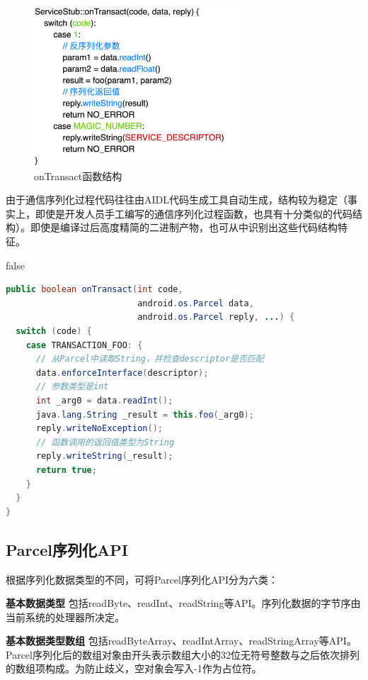 \documentclass[winfonts,master,twoside]{njuthesis}
\begin{document}
\begin{figure}
	\centering
	\includegraphics[width=0.7\textwidth]{figure/3-extractor/ontransact-impl.png}
	\caption{onTransact函数结构}
	\label{ontransact-impl}
\end{figure}

由于通信序列化过程代码往往由AIDL代码生成工具自动生成，结构较为稳定（事实上，即使是开发人员手工编写的通信序列化过程函数，也具有十分类似的代码结构）。即使是编译过后高度精简的二进制产物，也可从中识别出这些代码结构特征。


\if false
\begin{lstlisting}[caption={服务通信函数Java代码},label={lst:binder_transaction_java_example},language=java] 
public boolean onTransact(int code, 
                          android.os.Parcel data, 
                          android.os.Parcel reply, ...) {
  switch (code) {
    case TRANSACTION_FOO: {
      // 从Parcel中读取String，并检查descriptor是否匹配
      data.enforceInterface(descriptor);
      // 参数类型是int
      int _arg0 = data.readInt();
      java.lang.String _result = this.foo(_arg0);
      reply.writeNoException();
      // 函数调用的返回值类型为String
      reply.writeString(_result);
      return true;
    }
  }
}
\end{lstlisting}
\fi

\subsection{Parcel序列化API}

根据序列化数据类型的不同，可将Parcel序列化API分为六类：

\textbf{基本数据类型} \quad 包括readByte、readInt、readString等API。序列化数据的字节序由当前系统的处理器所决定。

\textbf{基本数据类型数组} \quad 包括readByteArray、readIntArray、readStringArray等API。Parcel序列化后的数组对象由开头表示数组大小的32位无符号整数与之后依次排列的数组项构成。为防止歧义，空对象会写入-1作为占位符。
\end{document}
